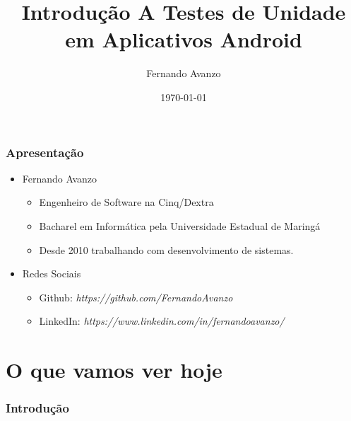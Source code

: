 \documentclass{beamer}
\title[TDD com Android]{Introdução A Testes de Unidade em Aplicativos Android}
\author{Fernando Avanzo}
\institute[] 
{ %
\medskip
\textit{fernando.avanzo@gmail.com} %
}
\date{\today} %
\begin{document}
\begin{frame}
	\titlepage %
\end{frame}

\begin{frame}
	\frametitle{Apresentação}
	\begin{itemize}
		\item Fernando Avanzo 
		\begin{itemize}
			\item Engenheiro de Software na Cinq/Dextra
			\item Bacharel em Informática pela Universidade Estadual de Maringá
			\item Desde 2010 trabalhando com desenvolvimento de sistemas.
		\end{itemize}
		\item Redes Sociais
		\begin{itemize}
			\item Github: \textit{https://github.com/FernandoAvanzo}
			\item LinkedIn: \textit{https://www.linkedin.com/in/fernandoavanzo/}
		\end{itemize}
	\end{itemize}
\end{frame}

\section{O que vamos ver hoje}
\begin{frame}
	\frametitle{Introdução} 
	\tableofcontents 
\end{frame}

\end{document}
